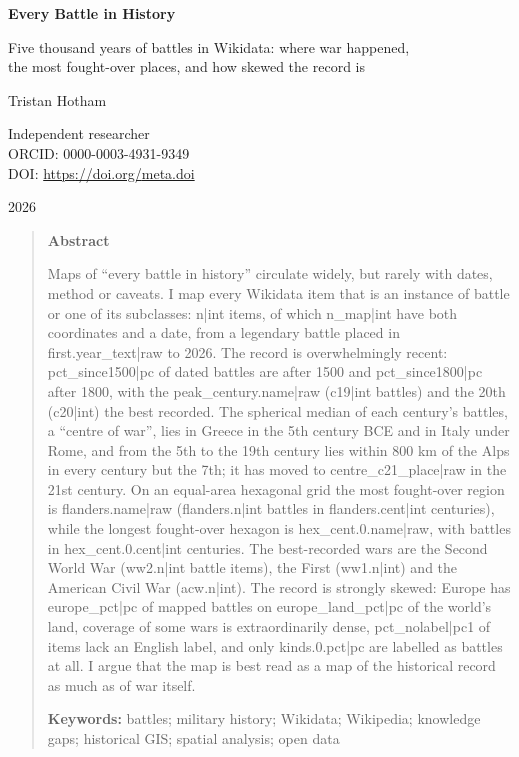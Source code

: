 \documentclass[11pt,a4paper]{article}
\begin{document}
\begin{center}
{\Large\bfseries Every Battle in History\par}
\vspace{0.4em}
{\large Five thousand years of battles in Wikidata: where war happened,\\the most fought-over places, and how skewed the record is\par}
\vspace{1.2em}
{\large Tristan Hotham\par}
\vspace{0.3em}
{\small Independent researcher\\
ORCID: 0000-0003-4931-9349\\
DOI: \href{https://doi.org/{{meta.doi}}}{https://doi.org/{{meta.doi}}}\par}
\vspace{0.8em}
2026
\end{center}

\begin{quote}
\small
\begin{center}\textbf{Abstract}\end{center}
Maps of ``every battle in history'' circulate widely, but rarely with dates, method or caveats. I map every Wikidata item that is an instance of battle or one of its subclasses: {{n|int}} items, of which {{n_map|int}} have both coordinates and a date, from a legendary battle placed in {{first.year_text|raw}} to 2026. The record is overwhelmingly recent: {{pct_since1500|pc}} of dated battles are after 1500 and {{pct_since1800|pc}} after 1800, with the {{peak_century.name|raw}} ({{c19|int}} battles) and the 20th ({{c20|int}}) the best recorded. The spherical median of each century's battles, a ``centre of war'', lies in Greece in the 5th century BCE and in Italy under Rome, and from the 5th to the 19th century lies within 800 km of the Alps in every century but the 7th; it has moved to {{centre_c21_place|raw}} in the 21st century. On an equal-area hexagonal grid the most fought-over region is {{flanders.name|raw}} ({{flanders.n|int}} battles in {{flanders.cent|int}} centuries), while the longest fought-over hexagon is {{hex_cent.0.name|raw}}, with battles in {{hex_cent.0.cent|int}} centuries. The best-recorded wars are the Second World War ({{ww2.n|int}} battle items), the First ({{ww1.n|int}}) and the American Civil War ({{acw.n|int}}). The record is strongly skewed: Europe has {{europe_pct|pc}} of mapped battles on {{europe_land_pct|pc}} of the world's land, coverage of some wars is extraordinarily dense, {{pct_nolabel|pc1}} of items lack an English label, and only {{kinds.0.pct|pc}} are labelled as battles at all. I argue that the map is best read as a map of the historical record as much as of war itself.

\textbf{Keywords:} battles; military history; Wikidata; Wikipedia; knowledge gaps; historical GIS; spatial analysis; open data
\end{quote}
\end{document}
